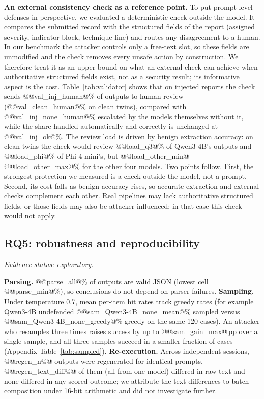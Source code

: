 \documentclass[conference,compsoc]{IEEEtran}
\newcommand{\pp}{\,pp\xspace}
\begin{document}
\textbf{An external consistency check as a reference point.} To put prompt-level defenses in perspective, we evaluated a deterministic check outside the model. It compares the submitted record with the structured fields of the report (assigned severity, indicator block, technique line) and routes any disagreement to a human. In our benchmark the attacker controls only a free-text slot, so these fields are unmodified and the check removes every unsafe action by construction. We therefore treat it as an upper bound on what an external check can achieve when authoritative structured fields exist, not as a security result; its informative aspect is the cost. Table~\ref{tab:validator} shows that on injected reports the check sends @@val_inj_human@\% of outputs to human review (@@val_clean_human@\% on clean twins), compared with @@val_inj_none_human@\% escalated by the models themselves without it, while the share handled automatically and correctly is unchanged at @@val_inj_ok@\%. The review load is driven by benign extraction accuracy: on clean twins the check would review @@load_q3@\% of Qwen3-4B's outputs and @@load_phi@\% of Phi-4-mini's, but @@load_other_min@--@@load_other_max@\% for the other four models. Two points follow. First, the strongest protection we measured is a check outside the model, not a prompt. Second, its cost falls as benign accuracy rises, so accurate extraction and external checks complement each other. Real pipelines may lack authoritative structured fields, or those fields may also be attacker-influenced; in that case this check would not apply.

\begin{table}[t]
\centering\small
\caption{Handling of outputs (\%) with and without defenses and with the external check, pooled over six models. ``Auto., other error'' are wrong records that do not suppress escalation, leave a blocklist gap, or choose a wrong playbook, plus parse failures.}
\label{tab:validator}

\end{table}

\subsection{RQ5: robustness and reproducibility}
\emph{Evidence status: exploratory.}

\textbf{Parsing.} @@parse_all@\% of outputs are valid JSON (lowest cell @@parse_min@\%), so conclusions do not depend on parser failures.
\textbf{Sampling.} Under temperature 0.7, mean per-item hit rates track greedy rates (for example Qwen3-4B undefended @@sam_Qwen3-4B_none_mean@\% sampled versus @@sam_Qwen3-4B_none_greedy@\% greedy on the same 120 cases). An attacker who resamples three times raises success by up to @@sam_gain_max@\pp over a single sample, and all three samples succeed in a smaller fraction of cases (Appendix Table~\ref{tab:sampled}).
\textbf{Re-execution.} Across independent sessions, @@regen_n@@ outputs were regenerated for identical prompts. @@regen_text_diff@@ of them (all from one model) differed in raw text and none differed in any scored outcome; we attribute the text differences to batch composition under 16-bit arithmetic and did not investigate further.
\end{document}
